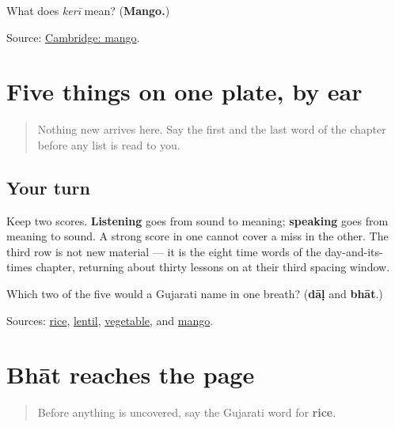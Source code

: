 \begin{tcolorbox}[breakable,colback=teal!4,colframe=teal!35!black,title={Before you move on}]
What does \emph{kerī} mean? (\textbf{Mango.})

Source: \href{https://dictionary.cambridge.org/dictionary/english-gujarati/mango}{Cambridge: mango}.
\end{tcolorbox}
\section[Practice]{Five things on one plate, by ear}

\label{lesson:GU-C27-plate-five}



\begin{quote}
Nothing new arrives here. Say the first and the last word of the chapter before any list is read to you.
\end{quote}

\subsection*{Your turn}
Keep two scores. \textbf{Listening} goes from sound to meaning; \textbf{speaking} goes from meaning to sound. A strong score in one cannot cover a miss in the other. The third row is not new material — it is the eight time words of the day-and-its-times chapter, returning about thirty lessons on at their third spacing window.

\begin{tcolorbox}[breakable,colback=teal!4,colframe=teal!35!black,title={Before you move on}]
Which two of the five would a Gujarati name in one breath? (\textbf{dāḷ} and \textbf{bhāt}.)

Sources: \href{https://dictionary.cambridge.org/dictionary/english-gujarati/rice}{rice}, \href{https://dictionary.cambridge.org/dictionary/english-gujarati/lentil}{lentil}, \href{https://dictionary.cambridge.org/dictionary/english-gujarati/vegetable}{vegetable}, and \href{https://dictionary.cambridge.org/dictionary/english-gujarati/mango}{mango}.
\end{tcolorbox}
\section[Practice]{Bhāt reaches the page}

\label{lesson:GU-C27-bhaat}



\begin{quote}
Before anything is uncovered, say the Gujarati word for \textbf{rice}.
\end{quote}

